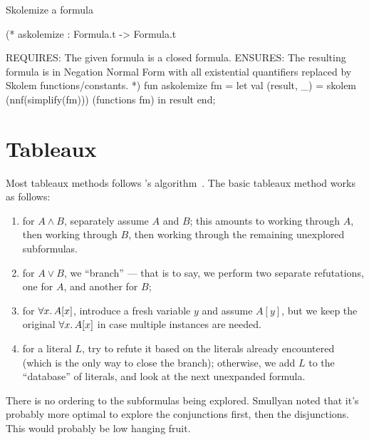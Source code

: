 \nwenddocs{}\endmoddef\nwstartdeflinemarkup{}\nwenddeflinemarkup
\LA{}Skolemize a formula~{\nwtagstyle{}}\RA{}

(* askolemize : Formula.t -> Formula.t

REQUIRES: The given formula is a closed formula.
ENSURES: The resulting formula is in Negation Normal Form with
         all existential quantifiers replaced by Skolem
         functions/constants. *)
fun askolemize fm =
  let val (result, _) = skolem (nnf(simplify(fm))) (functions fm)
  in result end;
\nwendcode{}\nwdocspar

\section{Tableaux}

\begin{node}
Most tableaux methods follows \leanTAP's algorithm~\cite{beckert1995leantap}.
The basic tableaux method works as follows:
\begin{enumerate}
\item for $A\land B$, separately assume $A$ and $B$; this amounts to
  working through $A$, then working through $B$, then working through
  the remaining unexplored subformulas.
\item for $A\lor B$, we ``branch'' --- that is to say, we perform two
  separate refutations, one for $A$, and another for $B$;
\item for $\forall x\ldotp A[x]$, introduce a fresh variable $y$ and
  assume $A[y]$, but we keep the original $\forall x\ldotp A[x]$
  in case multiple instances are needed.
\item for a literal $L$, try to refute it based on the literals
  already encountered (which is the only way to close the branch);
  otherwise, we add $L$ to the ``database'' of
  literals, and look at the next unexpanded formula.
\end{enumerate}
There is no ordering to the subformulas being explored. Smullyan noted
that it's probably more optimal to explore the conjunctions first,
then the disjunctions. This would probably be low hanging fruit.
\end{node}

